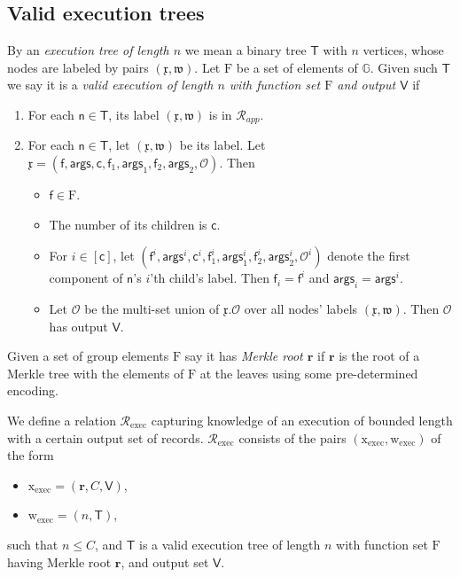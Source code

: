 \documentclass[11pt]{article} %
\newcommand{\G}{\ensuremath{{\mathbb G}}\xspace}
\newcommand{\rel}{\ensuremath{\mathcal{R}}\xspace}
\newcommand{\f}{\ensuremath{\mathsf{f}}\xspace}
\newcommand{\relapp}{\ensuremath{\rel_{app}}\xspace}
\newcommand{\relexec}{\ensuremath{\rel_{\mathrm{exec}}}\xspace}
\newcommand{\ops}{\ensuremath{\mathcal{O}}\xspace}
\newcommand{\instapp}{\ensuremath{\mathfrak{x}}\xspace}
\newcommand{\witapp}{\ensuremath{\mathfrak{w}}\xspace}
\renewcommand{\root}{\ensuremath{\mathbf{r}}\xspace}
\newcommand{\funcs}{\ensuremath{\mathrm{F}}\xspace}
\newcommand{\instexec}{\ensuremath{\mathrm{x_{exec}}}\xspace}
\newcommand{\witexec}{\ensuremath{\mathrm{w_{exec}}}\xspace}
\newcommand{\args}{\ensuremath{\mathsf{args}}\xspace}
\newcommand{\callnum}{\ensuremath{\mathsf{c}}\xspace}
\newcommand{\recset}{\ensuremath{\mathsf{V}}\xspace}
\newcommand{\tree}{\ensuremath{\mathsf{T}}\xspace}
\newcommand{\node}{\ensuremath{\mathsf{n}}\xspace}
\begin{document}
\subsection{Valid execution trees}\label{sec:validexec}

By an \emph{execution tree of length $n$} we mean a binary tree \tree with $n$ vertices, whose nodes are
labeled by pairs $(\instapp,\witapp)$.
Let \funcs be a set of elements of \G.
Given such \tree we say it is a \emph{valid execution of length $n$ with function set \funcs and output \recset} if
\begin{enumerate}
 \item For each $\node\in\tree$, its label $(\instapp,\witapp)$ is in \relapp.
    \item For each $\node\in \tree$, let $(\instapp,\witapp)$ be its label. Let 
$\instapp= (\f,\args,\callnum, \f_1,\args_1, \f_2,\args_2,\ops)$. Then
    \begin{itemize}
    \item $\f\in \funcs$.
     \item The number of its children is \callnum.
     \item For $i\in [\callnum]$, let $(\f^i,\args^i,\callnum^i, \f^i_1,\args^i_1, \f^i_2,\args^i_2,\ops^i)$ denote the first component of $\node$'s $i$'th child's label. Then $\f_i=\f^i$ and  $\args_i=\args^i$.
     \item Let \ops be the multi-set union of $\instapp.\ops$ over all nodes' labels $(\instapp,\witapp)$. Then \ops has output \recset.
     
    \end{itemize}

\end{enumerate}
Given a set of group elements \funcs say it has \emph{Merkle root \root} if \root is the root of a Merkle tree with the elements of  \funcs at the leaves using some pre-determined encoding.

We define a relation \relexec capturing knowledge of an execution of bounded length with a certain output set of records.
$\relexec$ consists of the pairs $(\instexec,\witexec)$
of the form 
\begin{itemize}
 \item $\instexec=(\root,C,\recset)$,
 \item $\witexec=(n,\tree)$,
\end{itemize}
such that $n\leq C$, and  \tree is a valid execution tree of length $n$ with function set \funcs having Merkle root \root, and output set \recset. 
\end{document}
